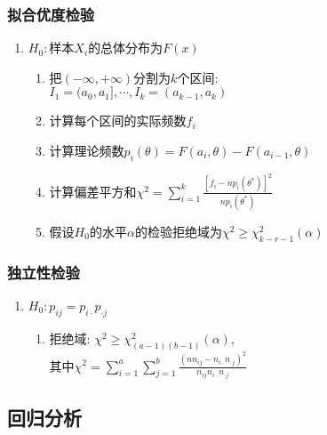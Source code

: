 \documentclass[10pt,a4paper,nofonts]{ctexart}
\renewcommand{\ge}{\geqslant}
\begin{document}
\begin{multicols}{2}
\begin{enumerate}
\end{enumerate}

\subsubsection{拟合优度检验}

\begin{enumerate}
\item $H_0:$样本$X_i$的总体分布为$F(x)$
\begin{enumerate}
\item 把$(-\infty,+\infty)$分割为$k$个区间:\\$I_1=(a_0,a_1], \cdots, I_k=(a_{k-1},a_k)$
\item 计算每个区间的实际频数$f_i$
\item 计算理论频数$p_i(\theta)=F(a_i,\theta)-F(a_{i-1},\theta)$
\item 计算偏差平方和$\chi^2=\sum_{i=1}^k\frac{[f_i-np_i(\theta^*)]^2}{np_i(\theta^*)}$
\item 假设$H_0$的水平$\alpha$的检验拒绝域为$\chi^2\ge\chi^2_{k-r-1}(\alpha)$
\end{enumerate}
\end{enumerate}

\subsubsection{独立性检验}

\begin{enumerate}
\item $H_0:p_{ij}=p_{i\cdot}p_{\cdot j}$
\begin{enumerate}
\item 拒绝域: $\chi^2\ge\chi^2_{(a-1)(b-1)}(\alpha)$,\\
其中$\chi^2=\sum_{i=1}^a\sum_{j=1}^b\frac{(nn_{ij}-n_{i\cdot}n_{\cdot j})^2}{n_{ij}n_{i\cdot}n_{\cdot j}}$
\end{enumerate}
\end{enumerate}


\subsection{回归分析}

\begin{enumerate}


\end{enumerate}
\end{multicols}
\end{document}
